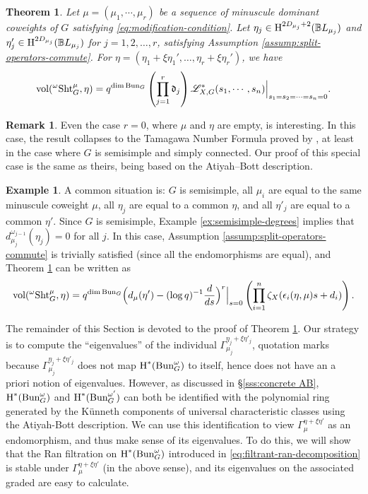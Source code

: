 \documentclass[reqno]{amsart}
\numberwithin{equation}{subsection}
\newtheorem{theorem}[subsubsection]{Theorem}
\theoremstyle{definition}
\newtheorem{remark}[subsubsection]{Remark}
\newtheorem{exam}[subsubsection]{Example}
\def\BB{\mathbb{B}}
\newcommand\frd{\mathfrak{d}}
\newcommand{\sL}{{\mathscr{L}}}
\newcommand{\Bun}{\textup{Bun}}
\newcommand\Sht{\textup{Sht}}
\newcommand{\vol}{\textup{vol}}
\newcommand{\cohog}[2]{\textup{H}^{#1}({#2})}     %
\newcommand\G\Gamma
\newcommand{\e}{\epsilon}
\newcommand{\y}{\eta}
\newcommand{\z}{\zeta}
\newcommand{\om}{\omega}
\begin{document}
\begin{theorem}\label{th:vol gen} Let $\mu=(\mu_{1},\cdots, \mu_{r})$ be a sequence of minuscule dominant coweights of $G$ satisfying \eqref{eq:modification-condition}. Let $\y_{j}\in \cohog{2D_{\mu_j}+2}{\BB L_{\mu_j}}$ and $\y'_{j}\in \cohog{2D_{\mu_j}}{\BB L_{\mu_j}}$ for $j=1, 2, \ldots, r$, satisfying Assumption \ref{assump:split-operators-commute}. For $\eta = (\eta_1+\xi \eta_1', \ldots, \eta_r+\xi \eta_r')$, we have 
\begin{equation}\label{eq:split-volume-formula}
\vol({}^{\omega}\Sht_G^\mu, \eta) = q^{\dim \Bun_{G}}\left(\prod_{j=1}^{r}\frd_{j}\right)\sL^{*}_{X,G}(s_{1},\cdots, s_{n})\Big|_{s_{1}=s_{2}=\cdots=s_{n}=0}.
\end{equation}
\end{theorem}

\begin{remark}
Even the case $r=0$, where $\mu$ and $\eta$ are empty, is interesting. In this case, the result collapses to the Tamagawa Number Formula proved by \cite{GL14}, at least in the case where $G$ is semisimple and simply connected. Our proof of this special case is the same as theirs, being based on the Atiyah--Bott description. 
\end{remark}


\begin{exam}
A common situation is: $G$ is semisimple, all $\mu_{i}$ are equal to the same minuscule coweight $\mu$, all $\y_{j}$ are equal to a common $\y$, and all $\y'_{j}$ are equal to a common $\y'$. Since $G$ is semisimple, Example \ref{ex:semisimple-degrees} implies that $d_{\mu_j}^{\omega_{j-1}}(\eta_j) = 0$ for all $j$. In this case, Assumption \ref{assump:split-operators-commute} is trivially satisfied (since all the endomorphisms are equal), and Theorem \ref{th:vol gen} can be written as
\begin{equation*}
\vol({}^\om\Sht_G^\mu, \eta)  =q^{\dim \Bun_{G}}
\Big(d_{\mu}(\y')-(\log q)^{-1}\frac{d}{ds}\Big)^r\Big|_{s=0}\left(\prod_{i=1}^{n}\z_{X}(\e_{i}(\y,\mu)s+d_{i})\right).
\end{equation*}
\end{exam}

The remainder of this Section is devoted to the proof of Theorem \ref{th:vol gen}. Our strategy is to compute the ``eigenvalues'' of the individual $\G_{\mu_j}^{\y_j+\xi\y'_j}$, quotation marks because $\G_{\mu_j}^{\y_j+\xi\y'_j}$ does not map $\cohog{*}{\Bun^{\om}_{G}}$ to itself, hence does not have an a priori notion of eigenvalues. However, as discussed in \S \ref{sss:concrete AB}, $\cohog{*}{\Bun^{\om}_{G}}$ and $\cohog{*}{\Bun^{\om'}_{G}}$ can both be identified with the polynomial ring generated by the K\"unneth components of universal characteristic classes using the Atiyah-Bott description.  We can use this identification to view $\G_{\mu}^{\y+\xi\y'}$ as an endomorphism, and thus make sense of its eigenvalues. To do this, we will show that the Ran filtration on $\cohog{*}{\Bun^{\om}_{G}}$ introduced in \eqref{eq:filtrant-ran-decomposition} is stable under $\G_{\mu}^{\y+\xi\y'}$ (in the above sense), and its eigenvalues on the associated graded are easy to calculate.
\end{document}
